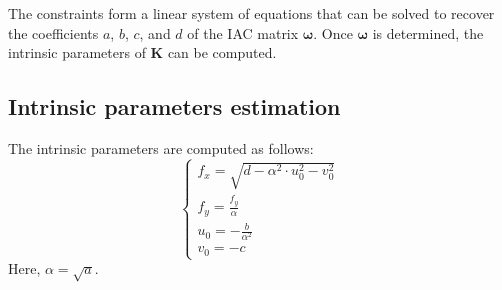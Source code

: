 The constraints form a linear system of equations that can be solved to recover the coefficients $a$, $b$, $c$, and $d$ of the IAC matrix $\boldsymbol{\omega}$. 
Once $\boldsymbol{\omega}$ is determined, the intrinsic parameters of $\mathbf{K}$ can be computed.

\subsection{Intrinsic parameters estimation}
The intrinsic parameters are computed as follows:
\[\begin{cases}
    f_x = \sqrt{d - \alpha^2 \cdot u_0^2 - v_0^2} \\
    f_y = \frac{f_y}{\alpha} \\
    u_0 = - \frac{b}{\alpha^2} \\
    v_0 = - c
\end{cases}\]
Here, $\alpha = \sqrt{a}$. 
